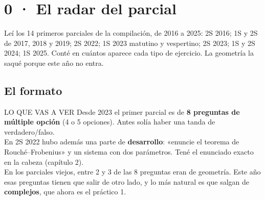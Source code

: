 {\hypersetup{linkcolor=tinta}\renewcommand{\contentsname}{Índice}\tableofcontents}
\newpage

\chapter*{0 · El radar del parcial}

Leí los 14 primeros parciales de la compilación, de 2016 a 2025: 2S 2016; 1S y 2S de 2017, 2018 y 2019; 2S 2022; 1S 2023 matutino y vespertino; 2S 2023; 1S y 2S 2024; 1S 2025. Conté en cuántos aparece cada tipo de ejercicio. La geometría la saqué porque este año no entra.

\section{El formato}
\begin{memo}{LO QUE VAS A VER}
Desde 2023 el primer parcial es de \textbf{8 preguntas de múltiple opción} (4 o 5 opciones). Antes solía haber una tanda de verdadero/falso.\\[2pt]
En 2S 2022 hubo además una parte de \textbf{desarrollo}: «enuncie el teorema de Rouché--Frobenius» y un sistema con dos parámetros. Tené el enunciado exacto en la cabeza (capítulo 2).\\[2pt]
En los parciales viejos, entre 2 y 3 de las 8 preguntas eran de geometría. Este año esas preguntas tienen que salir de otro lado, y lo más natural es que salgan de \textbf{complejos}, que ahora es el práctico 1.
\end{memo}

